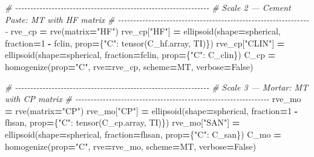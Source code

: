 \documentclass[
  a4paper,
  numbers=noendperiod,
  DIV=12]{scrreprt}
\newenvironment{Shaded}{\begin{snugshade}}{\end{snugshade}}
\newcommand{\CommentTok}[1]{\textcolor[rgb]{0.56,0.35,0.01}{\textit{#1}}}
\newcommand{\DecValTok}[1]{\textcolor[rgb]{0.00,0.00,0.81}{#1}}
\newcommand{\NormalTok}[1]{#1}
\newcommand{\OperatorTok}[1]{\textcolor[rgb]{0.81,0.36,0.00}{\textbf{#1}}}
\newcommand{\StringTok}[1]{\textcolor[rgb]{0.31,0.60,0.02}{#1}}
\newcommand{\VariableTok}[1]{\textcolor[rgb]{0.00,0.00,0.00}{#1}}
\begin{document}
\begin{Shaded}
\begin{Highlighting}[]
    \CommentTok{\# {-}{-}{-}{-}{-}{-}{-}{-}{-}{-}{-}{-}{-}{-}{-}{-}{-}{-}{-}{-}{-}{-}{-}{-}{-}{-}{-}{-}{-}{-}{-}{-}{-}{-}{-}{-}{-}{-}{-}{-}{-}{-}{-}{-}{-}{-}{-}{-}{-}{-}{-}{-}{-}{-}{-}{-}{-}{-}{-}{-}{-}{-}{-}{-}}
    \CommentTok{\# Scale 2 — Cement Paste: MT with HF matrix}
    \CommentTok{\# {-}{-}{-}{-}{-}{-}{-}{-}{-}{-}{-}{-}{-}{-}{-}{-}{-}{-}{-}{-}{-}{-}{-}{-}{-}{-}{-}{-}{-}{-}{-}{-}{-}{-}{-}{-}{-}{-}{-}{-}{-}{-}{-}{-}{-}{-}{-}{-}{-}{-}{-}{-}{-}{-}{-}{-}{-}{-}{-}{-}{-}{-}{-}{-}}
\NormalTok{    rve\_cp }\OperatorTok{=}\NormalTok{ rve(matrix}\OperatorTok{=}\StringTok{"HF"}\NormalTok{)}
\NormalTok{    rve\_cp[}\StringTok{"HF"}\NormalTok{]   }\OperatorTok{=}\NormalTok{ ellipsoid(shape}\OperatorTok{=}\NormalTok{spherical, fraction}\OperatorTok{=}\DecValTok{1} \OperatorTok{{-}}\NormalTok{ fclin,}
\NormalTok{                                prop}\OperatorTok{=}\NormalTok{\{}\StringTok{"C"}\NormalTok{: tensor(C\_hf.array, TI)\})}
\NormalTok{    rve\_cp[}\StringTok{"CLIN"}\NormalTok{] }\OperatorTok{=}\NormalTok{ ellipsoid(shape}\OperatorTok{=}\NormalTok{spherical, fraction}\OperatorTok{=}\NormalTok{fclin,}
\NormalTok{                                prop}\OperatorTok{=}\NormalTok{\{}\StringTok{"C"}\NormalTok{: C\_clin\})}
\NormalTok{    C\_cp }\OperatorTok{=}\NormalTok{ homogenize(prop}\OperatorTok{=}\StringTok{"C"}\NormalTok{, rve}\OperatorTok{=}\NormalTok{rve\_cp, scheme}\OperatorTok{=}\NormalTok{MT, verbose}\OperatorTok{=}\VariableTok{False}\NormalTok{)}

    \CommentTok{\# {-}{-}{-}{-}{-}{-}{-}{-}{-}{-}{-}{-}{-}{-}{-}{-}{-}{-}{-}{-}{-}{-}{-}{-}{-}{-}{-}{-}{-}{-}{-}{-}{-}{-}{-}{-}{-}{-}{-}{-}{-}{-}{-}{-}{-}{-}{-}{-}{-}{-}{-}{-}{-}{-}{-}{-}{-}{-}{-}{-}{-}{-}{-}{-}}
    \CommentTok{\# Scale 3 — Mortar: MT with CP matrix}
    \CommentTok{\# {-}{-}{-}{-}{-}{-}{-}{-}{-}{-}{-}{-}{-}{-}{-}{-}{-}{-}{-}{-}{-}{-}{-}{-}{-}{-}{-}{-}{-}{-}{-}{-}{-}{-}{-}{-}{-}{-}{-}{-}{-}{-}{-}{-}{-}{-}{-}{-}{-}{-}{-}{-}{-}{-}{-}{-}{-}{-}{-}{-}{-}{-}{-}{-}}
\NormalTok{    rve\_mo }\OperatorTok{=}\NormalTok{ rve(matrix}\OperatorTok{=}\StringTok{"CP"}\NormalTok{)}
\NormalTok{    rve\_mo[}\StringTok{"CP"}\NormalTok{]  }\OperatorTok{=}\NormalTok{ ellipsoid(shape}\OperatorTok{=}\NormalTok{spherical, fraction}\OperatorTok{=}\DecValTok{1} \OperatorTok{{-}}\NormalTok{ fhsan,}
\NormalTok{                               prop}\OperatorTok{=}\NormalTok{\{}\StringTok{"C"}\NormalTok{: tensor(C\_cp.array, TI)\})}
\NormalTok{    rve\_mo[}\StringTok{"SAN"}\NormalTok{] }\OperatorTok{=}\NormalTok{ ellipsoid(shape}\OperatorTok{=}\NormalTok{spherical, fraction}\OperatorTok{=}\NormalTok{fhsan,}
\NormalTok{                               prop}\OperatorTok{=}\NormalTok{\{}\StringTok{"C"}\NormalTok{: C\_san\})}
\NormalTok{    C\_mo }\OperatorTok{=}\NormalTok{ homogenize(prop}\OperatorTok{=}\StringTok{"C"}\NormalTok{, rve}\OperatorTok{=}\NormalTok{rve\_mo, scheme}\OperatorTok{=}\NormalTok{MT, verbose}\OperatorTok{=}\VariableTok{False}\NormalTok{)}


\end{Highlighting}
\end{Shaded}
\end{document}
